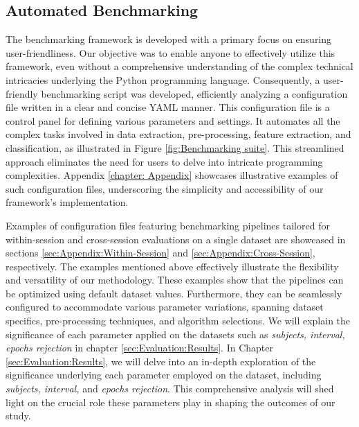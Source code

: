 \subsection{Automated Benchmarking}
The benchmarking framework is developed with a primary focus on ensuring user-friendliness. Our objective was to enable anyone to effectively utilize this framework, even without a comprehensive understanding of the complex technical intricacies underlying the Python programming language. Consequently, a user-friendly benchmarking script was developed, efficiently analyzing a configuration file written in a clear and concise YAML manner. This configuration file is a control panel for defining various parameters and settings. It automates all the complex tasks involved in data extraction, pre-processing, feature extraction, and classification, as illustrated in Figure \ref{fig:Benchmarking suite}. This streamlined approach eliminates the need for users to delve into intricate programming complexities. Appendix \ref{chapter: Appendix} showcases illustrative examples of such configuration files, underscoring the simplicity and accessibility of our framework's implementation.
\smallskip

Examples of configuration files featuring benchmarking pipelines tailored for within-session and cross-session evaluations on a single dataset are showcased in sections \ref{sec:Appendix:Within-Session} and \ref{sec:Appendix:Cross-Session}, respectively. The examples mentioned above effectively illustrate the flexibility and versatility of our methodology. These examples show that the pipelines can be optimized using default dataset values. Furthermore, they can be seamlessly configured to accommodate various parameter variations, spanning dataset specifics, pre-processing techniques, and algorithm selections. We will explain the significance of each parameter applied on the datasets such as \textit{subjects, interval, epochs rejection} in chapter \ref{sec:Evaluation:Results}. In Chapter \ref{sec:Evaluation:Results}, we will delve into an in-depth exploration of the significance underlying each parameter employed on the dataset, including \textit{subjects, interval,} and \textit{epochs rejection}. This comprehensive analysis will shed light on the crucial role these parameters play in shaping the outcomes of our study.


